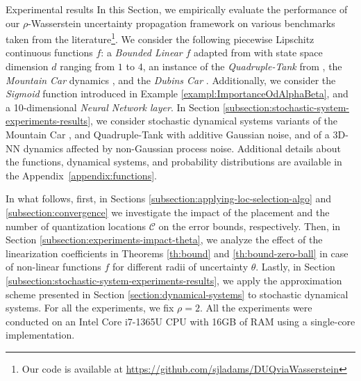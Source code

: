 \documentclass[11pt, a4paper, oneside,reqno]{amsart}
\makeatletter
\def\section{\@startsection{section}{1}%
	\z@{.7\linespacing\@plus\linespacing}{.5\linespacing}%
	{\normalfont\large\bfseries}}
\theoremstyle{plain}
\def\bsC{{\bm{\mathcal{C}}}}
\makeatother
\begin{document}
\section{Experimental results}\label{section:experimental-results}
In this Section, we empirically evaluate the performance of our $\rho$-Wasserstein uncertainty propagation framework on various benchmarks taken from the literature\footnote{Our code is available at \url{https://github.com/sjladams/DUQviaWasserstein}}. We consider the following piecewise Lipschitz continuous functions $f$: a \textit{Bounded Linear} $f$ adapted from \cite{santoyo2021barrier} with state space dimension $d$ ranging from $1$ to $4$, an instance of the \textit{Quadruple-Tank} from \cite{johansson2000quadruple}, the \textit{Mountain Car} dynamics \cite{singh1996reinforcement}, and the \textit{Dubins Car} \cite{balkcom2018dubins}. Additionally, we consider the \textit{Sigmoid} function introduced in Example \ref{exampl:ImportanceOdAlphaBeta}, and a 10-dimensional \textit{Neural Network layer}. In Section \ref{subsection:stochastic-system-experiments-results}, we consider stochastic dynamical systems variants of the Mountain Car \cite{singh1996reinforcement}, and Quadruple-Tank \cite{johansson2000quadruple} with additive Gaussian noise, and of a 3D-NN dynamics affected by non-Gaussian process noise. Additional details about the functions, dynamical systems, and probability distributions are available in the Appendix~\ref{appendix:functions}.

In what follows, first, in Sections \ref{subsection:applying-loc-selection-algo} and \ref{subsection:convergence} we investigate the impact of the placement and the number of quantization locations \(\bsC\) on the error bounds, respectively. 
Then, in Section \ref{subsection:experiments-impact-theta}, we analyze the effect of the linearization coefficients in Theorems \ref{th:bound} and \ref{th:bound-zero-ball} in case of non-linear functions \(f\) for different radii of uncertainty \(\theta\). 
Lastly, in Section \ref{subsection:stochastic-system-experiments-results}, we apply the approximation scheme presented in Section \ref{section:dynamical-systems} to stochastic dynamical systems.   For all the experiments, we fix $\rho=2$.  All the experiments were conducted on an Intel Core i7-1365U CPU with 16GB of RAM using a single-core implementation.
\end{document}
